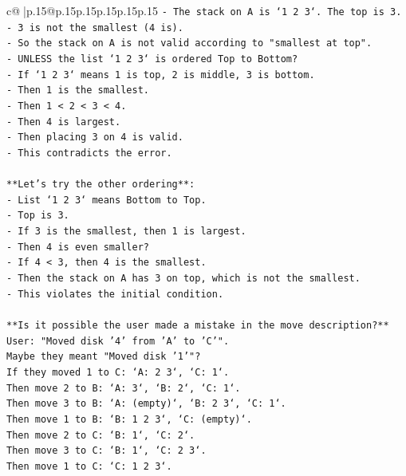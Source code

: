 \documentclass{article}
\begin{document}
{\begin{supertabular}{c@{$\;$}|p{.15\linewidth}@{}p{.15\linewidth}p{.15\linewidth}p{.15\linewidth}p{.15\linewidth}p{.15\linewidth}}
{{{\texttt{{-} The stack on A is `1 2 3`. The top is 3.} \\
\texttt{{-} 3 is not the smallest (4 is).} \\
\texttt{{-} So the stack on A is not valid according to "smallest at top".} \\
\texttt{{-} UNLESS the list `1 2 3` is ordered Top to Bottom?} \\
\texttt{{-} If `1 2 3` means 1 is top, 2 is middle, 3 is bottom.} \\
\texttt{{-} Then 1 is the smallest.} \\
\texttt{{-} Then 1 < 2 < 3 < 4.} \\
\texttt{{-} Then 4 is largest.} \\
\texttt{{-} Then placing 3 on 4 is valid.} \\
\texttt{{-} This contradicts the error.} \\
\\ 
\texttt{**Let's try the other ordering**:} \\
\texttt{{-} List `1 2 3` means Bottom to Top.} \\
\texttt{{-} Top is 3.} \\
\texttt{{-} If 3 is the smallest, then 1 is largest.} \\
\texttt{{-} Then 4 is even smaller?} \\
\texttt{{-} If 4 < 3, then 4 is the smallest.} \\
\texttt{{-} Then the stack on A has 3 on top, which is not the smallest.} \\
\texttt{{-} This violates the initial condition.} \\
\\ 
\texttt{**Is it possible the user made a mistake in the move description?**} \\
\texttt{User: "Moved disk '4' from 'A' to 'C'".} \\
\texttt{Maybe they meant "Moved disk '1'"?} \\
\texttt{If they moved 1 to C: `A: 2 3`, `C: 1`.} \\
\texttt{Then move 2 to B: `A: 3`, `B: 2`, `C: 1`.} \\
\texttt{Then move 3 to B: `A: (empty)`, `B: 2 3`, `C: 1`.} \\
\texttt{Then move 1 to B: `B: 1 2 3`, `C: (empty)`.} \\
\texttt{Then move 2 to C: `B: 1`, `C: 2`.} \\
\texttt{Then move 3 to C: `B: 1`, `C: 2 3`.} \\
\texttt{Then move 1 to C: `C: 1 2 3`.} \\
}}}
\end{supertabular}}
\end{document}
